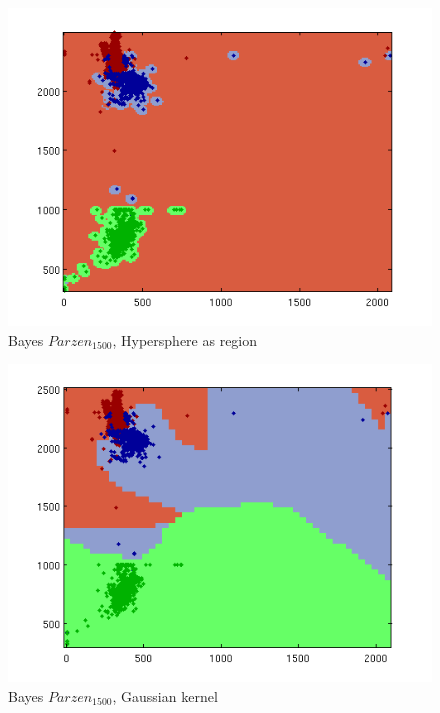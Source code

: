 \documentclass[a4paper]{article}
\begin{document}
\begin{figure}[htbp!]
\center
\includegraphics[clip, trim=40px 15px 30px 10px]{parzen_real_sphere.png}
\caption{Bayes $Parzen_{1500}$, Hypersphere as region}
\end{figure}

\begin{figure}[htbp!]
\center
\includegraphics[clip, trim=40px 15px 30px 10px]{parzen_real_gauss.png}
\caption{Bayes $Parzen_{1500}$, Gaussian kernel}
\end{figure}
\end{document}
